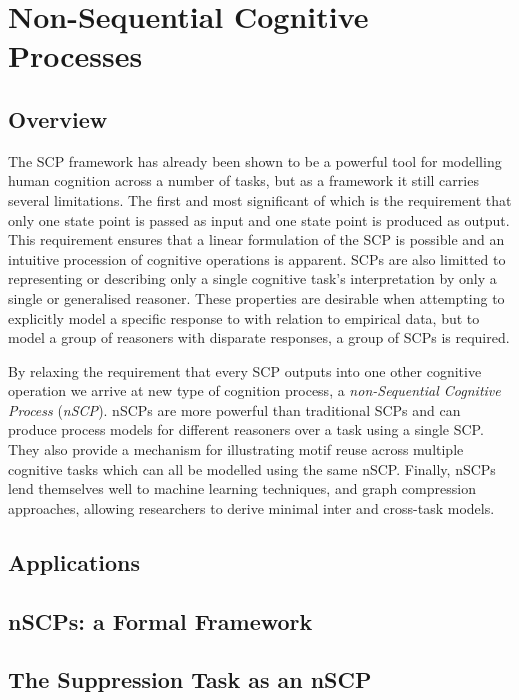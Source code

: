 \chapter{Non-Sequential Cognitive Processes} \label{chp:nscp}
\section{Overview}
The SCP framework has already been shown to be a powerful tool for modelling human cognition across a number of tasks, but as a framework it still carries several limitations. The first and most significant of which is the requirement that only one state point is passed as input and one state point is produced as output. This requirement ensures that a linear formulation of the SCP is possible and an intuitive procession of cognitive operations is apparent. SCPs are also limitted to representing or describing only a single cognitive task's interpretation by only a single or generalised reasoner. These properties are desirable when attempting to explicitly model a specific response to with relation to empirical data, but to model a group of reasoners with disparate responses, a group of SCPs is required.

By relaxing the requirement that every SCP outputs into one other cognitive operation we arrive at new type of cognition process, a \textit{non-Sequential Cognitive Process} (\textit{nSCP}). nSCPs are more powerful than traditional SCPs and can produce process models for different reasoners over a task using a single SCP. They also provide a mechanism for illustrating motif reuse across multiple cognitive tasks which can all be modelled using the same nSCP. Finally, nSCPs lend themselves well to machine learning techniques, and graph compression approaches, allowing researchers to derive minimal inter and cross-task models.

\section{Applications}

\section{nSCPs: a Formal Framework}

\section{The Suppression Task as an nSCP}

